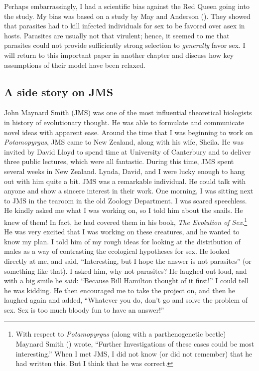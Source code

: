 \documentclass[
  letterpaper,
]{book}
\begin{document}
Perhaps embarrassingly, I had a scientific bias against the Red Queen
going into the study. My bias was based on a study by May and Anderson
(). They showed that
parasites had to kill infected individuals for sex to be favored over
asex in hosts. Parasites are usually not that virulent; hence, it seemed
to me that parasites could not provide sufficiently strong selection to
\emph{generally} favor sex. I will return to this important paper in
another chapter and discuss how key assumptions of their model have been
relaxed.

\subsection{A side story on JMS}\label{a-side-story-on-jms}

John Maynard Smith (JMS) was one of the most influential theoretical
biologists in history of evolutionary thought. He was able to formulate
and communicate novel ideas with apparent ease. Around the time that I
was beginning to work on \emph{Potamopyrgus}, JMS came to New Zealand,
along with his wife, Sheila. He was invited by David Lloyd to spend time
at University of Canterbury and to deliver three public lectures, which
were all fantastic. During this time, JMS spent several weeks in New
Zealand. Lynda, David, and I were lucky enough to hang out with him
quite a bit. JMS was a remarkable individual. He could talk with anyone
and show a sincere interest in their work. One morning, I was sitting
next to JMS in the tearoom in the old Zoology Department. I was scared
speechless. He kindly asked me what I was working on, so I told him
about the snails. He knew of them! In fact, he had covered them in his
book, \emph{The Evolution of Sex}.\footnote{With respect to
  \emph{Potamopyrgus} (along with a parthenogenetic beetle) Maynard
  Smith () wrote, ``Further
  Investigations of these cases could be most interesting.'' When I met
  JMS, I did not know (or did not remember) that he had written this.
  But I think that he was correct.} He was very excited that I was
working on these creatures, and he wanted to know my plan. I told him of
my rough ideas for looking at the distribution of males as a way of
contrasting the ecological hypotheses for sex. He looked directly at me,
and said, ``Interesting, but I hope the answer is not parasites'' (or
something like that). I asked him, why not parasites? He laughed out
loud, and with a big smile he said: ``Because Bill Hamilton thought of
it first!'' I could tell he was kidding. He then encouraged me to take
the project on, and then he laughed again and added, ``Whatever you do,
don't go and solve the problem of sex. Sex is too much bloody fun to
have an answer!''
\end{document}
